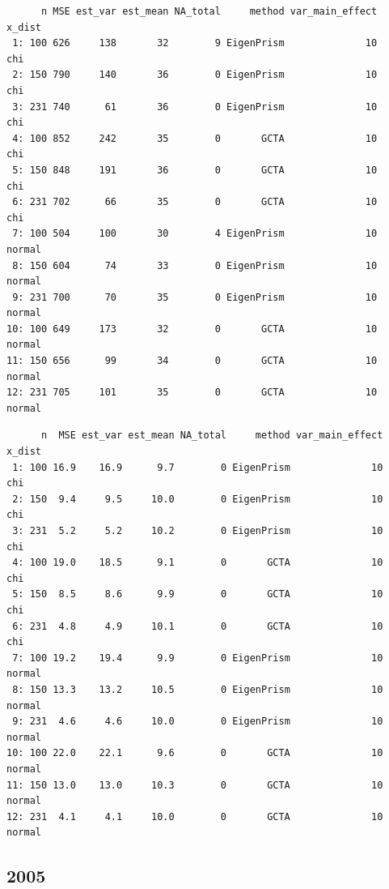 \documentclass[]{article}
\begin{document}
\begin{verbatim}
      n MSE est_var est_mean NA_total     method var_main_effect x_dist
 1: 100 626     138       32        9 EigenPrism              10    chi
 2: 150 790     140       36        0 EigenPrism              10    chi
 3: 231 740      61       36        0 EigenPrism              10    chi
 4: 100 852     242       35        0       GCTA              10    chi
 5: 150 848     191       36        0       GCTA              10    chi
 6: 231 702      66       35        0       GCTA              10    chi
 7: 100 504     100       30        4 EigenPrism              10 normal
 8: 150 604      74       33        0 EigenPrism              10 normal
 9: 231 700      70       35        0 EigenPrism              10 normal
10: 100 649     173       32        0       GCTA              10 normal
11: 150 656      99       34        0       GCTA              10 normal
12: 231 705     101       35        0       GCTA              10 normal
\end{verbatim}

\begin{verbatim}
      n  MSE est_var est_mean NA_total     method var_main_effect x_dist
 1: 100 16.9    16.9      9.7        0 EigenPrism              10    chi
 2: 150  9.4     9.5     10.0        0 EigenPrism              10    chi
 3: 231  5.2     5.2     10.2        0 EigenPrism              10    chi
 4: 100 19.0    18.5      9.1        0       GCTA              10    chi
 5: 150  8.5     8.6      9.9        0       GCTA              10    chi
 6: 231  4.8     4.9     10.1        0       GCTA              10    chi
 7: 100 19.2    19.4      9.9        0 EigenPrism              10 normal
 8: 150 13.3    13.2     10.5        0 EigenPrism              10 normal
 9: 231  4.6     4.6     10.0        0 EigenPrism              10 normal
10: 100 22.0    22.1      9.6        0       GCTA              10 normal
11: 150 13.0    13.0     10.3        0       GCTA              10 normal
12: 231  4.1     4.1     10.0        0       GCTA              10 normal
\end{verbatim}

\newpage

\subsection{2005}\label{section-1}
\end{document}
